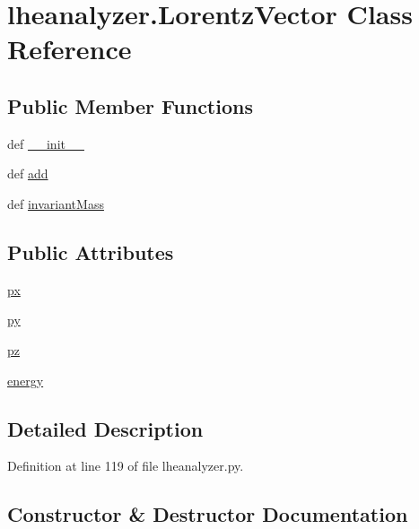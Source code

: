 \section{lheanalyzer.\-Lorentz\-Vector Class Reference}
\label{classlheanalyzer_1_1LorentzVector}
\subsection*{Public Member Functions}
\begin{DoxyCompactItemize}
\item 
def \hyperlink{classlheanalyzer_1_1LorentzVector_ae24f18c5d936d3b942187194ba267d15}{\-\_\-\-\_\-init\-\_\-\-\_\-}
\item 
def \hyperlink{classlheanalyzer_1_1LorentzVector_af3992462d579c268ce740296902c5413}{add}
\item 
def \hyperlink{classlheanalyzer_1_1LorentzVector_ad543d448877a601ebb121e4500141846}{invariant\-Mass}
\end{DoxyCompactItemize}
\subsection*{Public Attributes}
\begin{DoxyCompactItemize}
\item 
\hyperlink{classlheanalyzer_1_1LorentzVector_a18b761634276030aac330992d1653323}{px}
\item 
\hyperlink{classlheanalyzer_1_1LorentzVector_ac0c783eebdfb891dc6d34fd9da1ddb17}{py}
\item 
\hyperlink{classlheanalyzer_1_1LorentzVector_ab5f38fd6544fadb69158b7e7e8f96505}{pz}
\item 
\hyperlink{classlheanalyzer_1_1LorentzVector_ac898cd02348732dafbc2f9ecbd574fd1}{energy}
\end{DoxyCompactItemize}


\subsection{Detailed Description}


Definition at line 119 of file lheanalyzer.\-py.



\subsection{Constructor \& Destructor Documentation}
